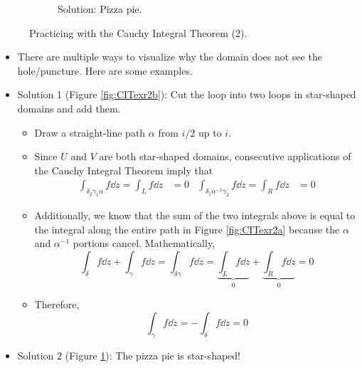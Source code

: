 \documentclass[../notes.tex]{subfiles}
\begin{document}
\begin{itemize}
\begin{figure}[h!]
\begin{subfigure}[b]{0.3\linewidth}
            \caption{Solution: Pizza pie.}
            \label{fig:CITexr2c}
        \end{subfigure}
        \caption{Practicing with the Cauchy Integral Theorem (2).}
        \label{fig:CITexr2}
    \end{figure}
    \begin{itemize}
        \item There are multiple ways to visualize why the domain does not see the hole/puncture. Here are some examples.
        \item Solution 1 (Figure \ref{fig:CITexr2b}): Cut the loop into two loops in star-shaped domains and add them.
        \begin{itemize}
            \item Draw a straight-line path $\alpha$ from $i/2$ up to $i$.
            \item Since $U$ and $V$ are both star-shaped domains, consecutive applications of the Cauchy Integral Theorem imply that
            \begin{align*}
                \int_{\delta_2\gamma_1\alpha}f\dd{z} = \int_Lf\dd{z} &= 0&
                \int_{\delta_1\alpha^{-1}\gamma_2}f\dd{z} = \int_Rf\dd{z} &= 0
            \end{align*}
            \item Additionally, we know that the sum of the two integrals above is equal to the integral along the entire path in Figure \ref{fig:CITexr2a} because the $\alpha$ and $\alpha^{-1}$ portions cancel. Mathematically,
            \begin{equation*}
                \int_\delta f\dd{z}+\int_\gamma f\dd{z} = \int_{\delta\gamma}f\dd{z}
                = \underbrace{\int_Lf\dd{z}}_0+\underbrace{\int_Rf\dd{z}}_0
                = 0
            \end{equation*}
            \item Therefore,
            \begin{equation*}
                \int_\gamma f\dd{z} = -\int_\delta f\dd{z} = 0
            \end{equation*}
        \end{itemize}
        \item Solution 2 (Figure \ref{fig:CITexr2c}): The pizza pie is star-shaped!

\end{itemize}
\end{itemize}
\end{document}
